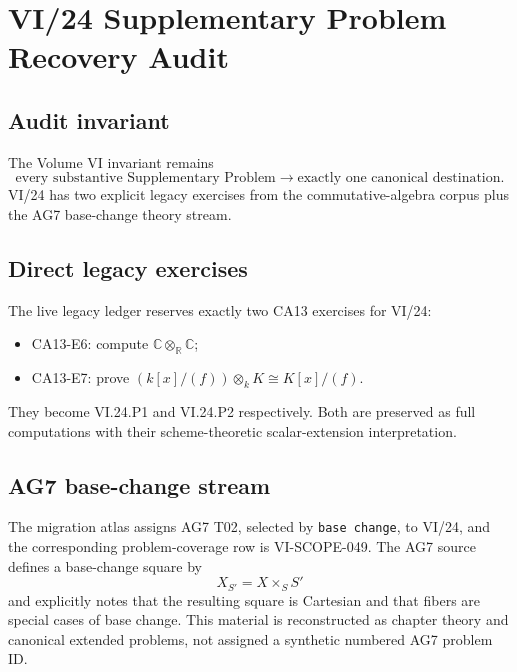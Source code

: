 \chapter*{VI/24 Supplementary Problem Recovery Audit}

\section*{Audit invariant}
The Volume VI invariant remains
\[
\boxed{\text{every substantive Supplementary Problem}\longrightarrow\text{exactly one canonical destination}.}
\]
VI/24 has two explicit legacy exercises from the commutative-algebra corpus plus the AG7 base-change
theory stream.

\section*{Direct legacy exercises}
The live legacy ledger reserves exactly two CA13 exercises for VI/24:
\begin{itemize}
\item CA13-E6: compute $\mathbb C\otimes_{\mathbb R}\mathbb C$;
\item CA13-E7: prove $(k[x]/(f))\otimes_kK\cong K[x]/(f)$.
\end{itemize}
They become VI.24.P1 and VI.24.P2 respectively.  Both are preserved as full computations with their
scheme-theoretic scalar-extension interpretation.

\section*{AG7 base-change stream}
The migration atlas assigns AG7 T02, selected by \texttt{base change}, to VI/24, and the corresponding
problem-coverage row is VI-SCOPE-049.  The AG7 source defines a base-change square by
\[
X_{S'}=X\times_SS'
\]
and explicitly notes that the resulting square is Cartesian and that fibers are special cases of
base change.  This material is reconstructed as chapter theory and canonical extended problems, not assigned a
synthetic numbered AG7 problem ID.

